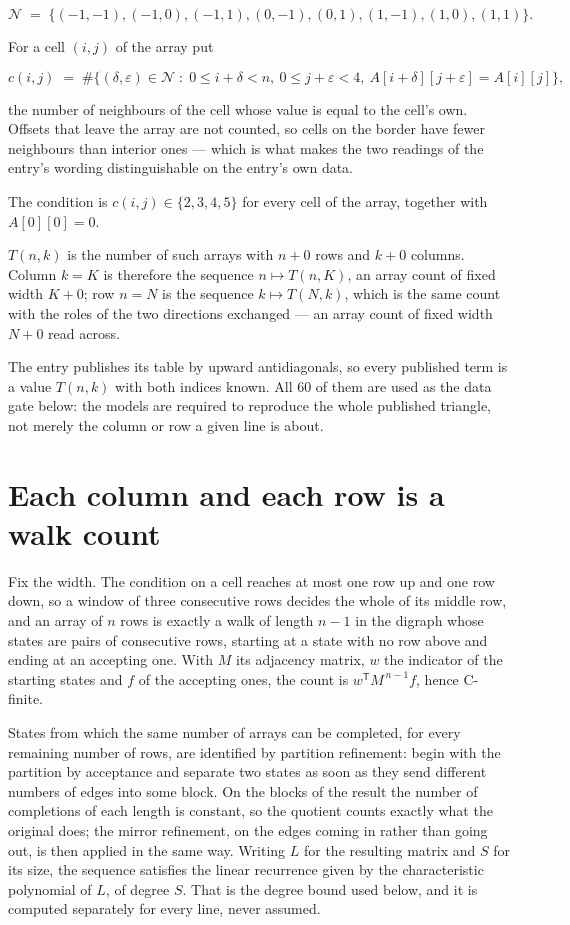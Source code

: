 \documentclass[11pt]{article}
\theoremstyle{definition}
\begin{document}
\[\mathcal{N} \;=\; \{(-1,-1), (-1,0), (-1,1), (0,-1), (0,1), (1,-1), (1,0), (1,1)\}.\]

For a cell $(i,j)$ of the array put

\[c(i,j) \;=\; \#\bigl\{(\delta,\varepsilon)\in\mathcal{N} \;:\; 0\le i+\delta<n,\ 0\le j+\varepsilon<4,\ A[i+\delta][j+\varepsilon] = A[i][j]\bigr\},\]

the number of neighbours of the cell whose value is equal to the cell's own. Offsets that leave the array are not counted, so cells on the border have fewer neighbours than interior ones --- which is what makes the two readings of the entry's wording distinguishable on the entry's own data.

The condition is $c(i,j) \in \{2, 3, 4, 5\}$ for every cell of the array, together with $A[0][0]=0$.

$T(n,k)$ is the number of such arrays with $n + 0$ rows and $k + 0$ columns. Column $k = K$ is therefore the sequence $n \mapsto T(n,K)$, an array count of fixed width $K + 0$; row $n = N$ is the sequence $k \mapsto T(N,k)$, which is the same count with the roles of the two directions exchanged --- an array count of fixed width $N + 0$ read across.

The entry publishes its table by upward antidiagonals, so every published term is a value $T(n,k)$ with both indices known. All 60 of them are used as the data gate below: the models are required to reproduce the whole published triangle, not merely the column or row a given line is about.

\section{Each column and each row is a walk count}

Fix the width. The condition on a cell reaches at most one row up and one row down, so a window of three consecutive rows decides the whole of its middle row, and an array of $n$ rows is exactly a walk of length $n-1$ in the digraph whose states are pairs of consecutive rows, starting at a state with no row above and ending at an accepting one. With $M$ its adjacency matrix, $w$ the indicator of the starting states and $f$ of the accepting ones, the count is $w^{\mathsf T}M^{\,n-1}f$, hence C-finite.

States from which the same number of arrays can be completed, for every remaining number of rows, are identified by partition refinement: begin with the partition by acceptance and separate two states as soon as they send different numbers of edges into some block. On the blocks of the result the number of completions of each length is constant, so the quotient counts exactly what the original does; the mirror refinement, on the edges coming in rather than going out, is then applied in the same way. Writing $L$ for the resulting matrix and $S$ for its size, the sequence satisfies the linear recurrence given by the characteristic polynomial of $L$, of degree $S$. That is the degree bound used below, and it is computed separately for every line, never assumed.
\end{document}
